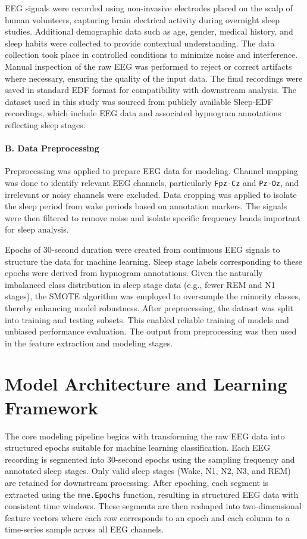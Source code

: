 EEG signals were recorded using non-invasive electrodes placed on the scalp of human volunteers, capturing brain electrical activity during overnight sleep studies. Additional demographic data such as age, gender, medical history, and sleep habits were collected to provide contextual understanding. The data collection took place in controlled conditions to minimize noise and interference. Manual inspection of the raw EEG was performed to reject or correct artifacts where necessary, ensuring the quality of the input data. The final recordings were saved in standard EDF format for compatibility with downstream analysis. The dataset used in this study was sourced from publicly available Sleep-EDF recordings, which include EEG data and associated hypnogram annotations reflecting sleep stages.

\paragraph{B. Data Preprocessing}

Preprocessing was applied to prepare EEG data for modeling. Channel mapping was done to identify relevant EEG channels, particularly \texttt{Fpz-Cz} and \texttt{Pz-Oz}, and irrelevant or noisy channels were excluded. Data cropping was applied to isolate the sleep period from wake periods based on annotation markers. The signals were then filtered to remove noise and isolate specific frequency bands important for sleep analysis.

Epochs of 30-second duration were created from continuous EEG signals to structure the data for machine learning. Sleep stage labels corresponding to these epochs were derived from hypnogram annotations. Given the naturally imbalanced class distribution in sleep stage data (e.g., fewer REM and N1 stages), the SMOTE algorithm was employed to oversample the minority classes, thereby enhancing model robustness. After preprocessing, the dataset was split into training and testing subsets. This enabled reliable training of models and unbiased performance evaluation. The output from preprocessing was then used in the feature extraction and modeling stages.




\section{Model Architecture and Learning Framework}


The core modeling pipeline begins with transforming the raw EEG data into structured epochs suitable for machine learning classification. Each EEG recording is segmented into 30-second epochs using the sampling frequency and annotated sleep stages. Only valid sleep stages (Wake, N1, N2, N3, and REM) are retained for downstream processing. After epoching, each segment is extracted using the \texttt{mne.Epochs} function, resulting in structured EEG data with consistent time windows. These segments are then reshaped into two-dimensional feature vectors where each row corresponds to an epoch and each column to a time-series sample across all EEG channels.

